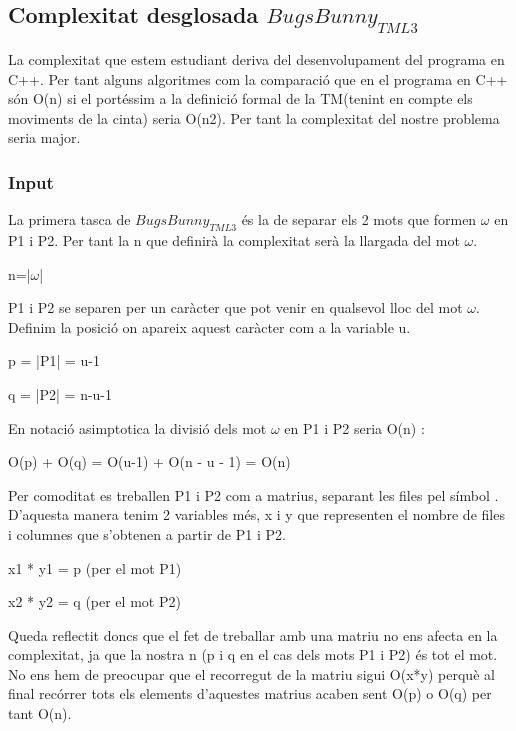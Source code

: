 \documentclass[12pt,a4paper]{report}
\def \w{$\omega$}
\def \tml3{$BugsBunny_{TML3} $}
\begin{document}
\subsection{Complexitat desglosada \tml3{}}

La complexitat que estem estudiant deriva del desenvolupament del programa en C++. Per tant alguns algoritmes com la comparació que en el programa en C++ són O(n) si el portéssim a la definició formal de la TM(tenint en compte els moviments de la cinta) seria O(n2). Per tant la complexitat del nostre problema seria major.

\subsubsection{Input}

La primera tasca de \tml3{} és la de separar els 2 mots que formen \w{} en P1 i P2. Per tant la n que definirà la complexitat serà la llargada del mot \w{}. 

\begin{center}
n=|\w{}|
\end{center}

P1 i P2 se separen per un caràcter \Return que pot venir en qualsevol lloc del mot \w{}. Definim la posició on apareix aquest caràcter com a la variable u.

\begin{center}
p = |P1| = u-1


q = |P2| = n-u-1
\end{center}

En notació asimptotica la divisió dels mot \w{} en P1 i P2 seria O(n) :

\begin{center}
O(p) + O(q) = O(u-1) +  O(n - u - 1) = O(n)
\end{center}

Per comoditat es treballen P1 i P2 com a matrius, separant les files pel símbol \Return. D’aquesta manera tenim 2 variables més, x i y que representen el nombre de files i columnes que s’obtenen a partir de P1 i P2.

\begin{center}
x1 * y1 = p (per el mot P1)

x2 * y2 = q (per el mot P2)
\end{center}

Queda reflectit doncs que el fet de treballar amb una matriu no ens afecta en la complexitat, ja que la nostra n (p i q en el cas dels mots P1 i P2) és tot el mot. No ens hem de preocupar que el recorregut de la matriu sigui O(x*y) perquè al final recórrer tots els elements d’aquestes matrius acaben sent O(p) o O(q) per tant O(n).
\end{document}
